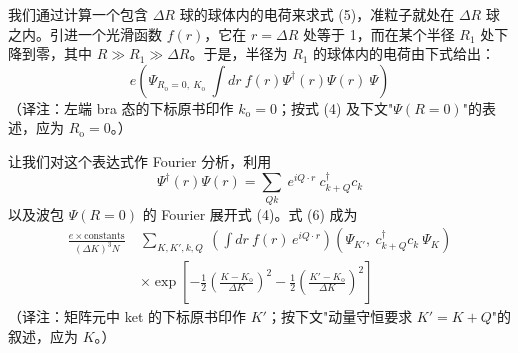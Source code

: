 我们通过计算一个包含 $\Delta R$ 球的球体内的电荷来求式 (5)，准粒子就处在 $\Delta R$ 球之内。引进一个光滑函数 $f(r)$，它在 $r=\Delta R$ 处等于 1，而在某个半径 $R_{1}$ 处下降到零，其中 $R\gg R_{1}\gg\Delta R$。于是，半径为 $R_{1}$ 的球体内的电荷由下式给出：
\begin{equation*}
e\left(\Psi_{R_{\mathrm{o}}=0,\ K_{\mathrm{o}}}\ \int dr\ f(r)\Psi^{\dagger}(r)\Psi(r)\ \Psi\right) \tag{6}
\end{equation*}
（译注：左端 bra 态的下标原书印作 $k_{\mathrm{o}}=0$；按式 (4) 及下文"$\Psi(R=0)$"的表述，应为 $R_{\mathrm{o}}=0$。）

让我们对这个表达式作 Fourier 分析，利用
\begin{equation*}
\Psi^{\dagger}(r)\Psi(r) = \sum_{Qk}\ e^{iQ\cdot r}\ c^{\dagger}_{k+Q}c_{k}
\end{equation*}
以及波包 $\Psi(R=0)$ 的 Fourier 展开式 (4)。式 (6) 成为
\begin{align*}
\frac{e\times\text{constants}}{(\Delta K)^{3}N}\ &\sum_{K,K',k,Q}\ \left(\int dr\ f(r)\,e^{iQ\cdot r}\right)\left(\Psi_{K'},\ c^{\dagger}_{k+Q}c_{k}\ \Psi_{K}\right)\\
&\times\exp\left[-\frac{1}{2}\left(\frac{K-K_{\mathrm{o}}}{\Delta K}\right)^{2}-\frac{1}{2}\left(\frac{K'-K_{\mathrm{o}}}{\Delta K}\right)^{2}\right]
\end{align*}
（译注：矩阵元中 ket 的下标原书印作 $K'$；按下文"动量守恒要求 $K'=K+Q$"的叙述，应为 $K$。）

